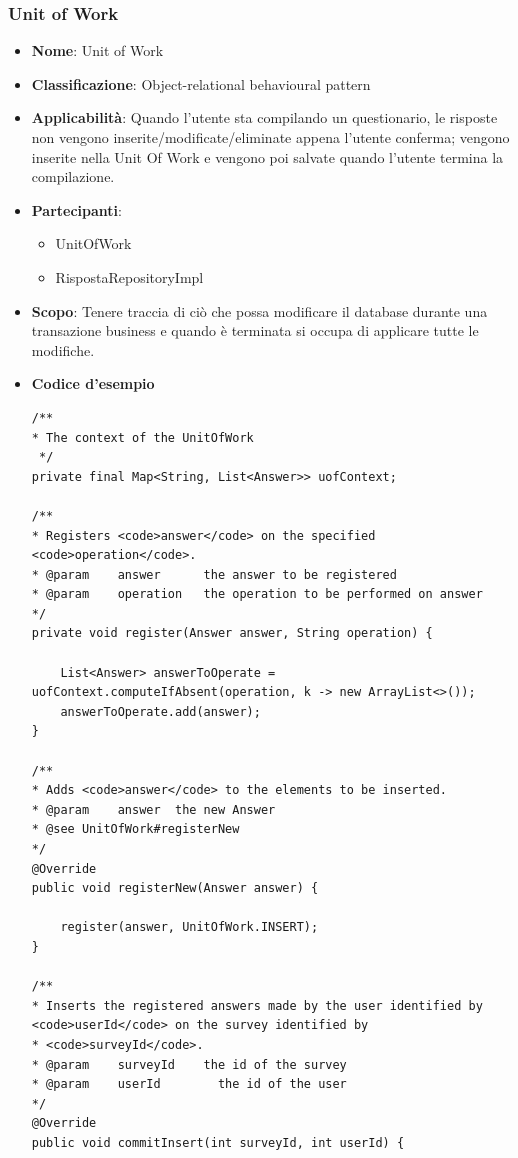 \documentclass[12pt]{article}
\begin{document}
	\subsubsection{Unit of Work}
    	\begin{itemize}
            \item \textbf{Nome}: Unit of Work
            \item \textbf{Classificazione}: Object-relational behavioural pattern
            \item \textbf{Applicabilità}: Quando l'utente sta compilando un questionario, le risposte non vengono inserite/modificate/eliminate appena l'utente conferma; vengono inserite nella Unit Of Work e vengono poi salvate quando l'utente termina la compilazione.
            \item \textbf{Partecipanti}:
                \begin{itemize}
                    \item {UnitOfWork}
                    \item {RispostaRepositoryImpl}
                    
                \end{itemize}
            \item \textbf{Scopo}: Tenere traccia di ciò che possa modificare il database durante una transazione business e quando è terminata si occupa di applicare tutte le modifiche.
             \item \textbf{Codice d'esempio}
            \begin{lstlisting}
/**
* The context of the UnitOfWork
 */
private final Map<String, List<Answer>> uofContext;

/**
* Registers <code>answer</code> on the specified <code>operation</code>.
* @param	answer		the answer to be registered
* @param	operation	the operation to be performed on answer
*/
private void register(Answer answer, String operation) {

	List<Answer> answerToOperate = uofContext.computeIfAbsent(operation, k -> new ArrayList<>());
	answerToOperate.add(answer);
}

/**
* Adds <code>answer</code> to the elements to be inserted.
* @param	answer	the new Answer
* @see UnitOfWork#registerNew
*/
@Override
public void registerNew(Answer answer) {

	register(answer, UnitOfWork.INSERT);
}

/**
* Inserts the registered answers made by the user identified by <code>userId</code> on the survey identified by
* <code>surveyId</code>.
* @param    surveyId    the id of the survey
* @param    userId        the id of the user
*/
@Override
public void commitInsert(int surveyId, int userId) {
	

\end{lstlisting}
\end{itemize}
\end{document}
